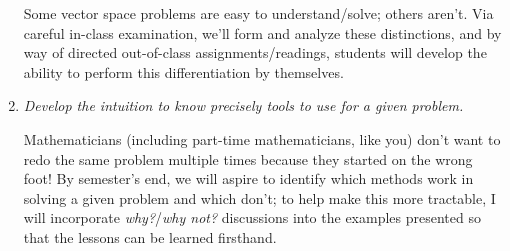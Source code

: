 \documentclass[12pt,oneside]{amsart}
\begin{document}
\begin{enumerate}[label=(Obj \arabic*),leftmargin=0.75in,rightmargin=0.25in,itemsep=1.5mm]
	Some vector space problems are easy to understand/solve; others aren't. Via careful in-class examination, we'll form and analyze these distinctions, and by way of directed out-of-class assignments/readings, students will develop the ability to perform this differentiation by themselves.
	
	\item \textit{Develop the intuition to know precisely {} tools to use for a given problem.}
	
	Mathematicians (including part-time mathematicians, like you) don't want to redo the same problem multiple times because they started on the wrong foot! By semester's end, we will aspire to identify which methods work in solving a given problem and which don't; to help make this more tractable, I will incorporate \textit{why?}/\textit{why not?} discussions into the examples presented so that the lessons can be learned firsthand.
\end{enumerate}

\end{document}
